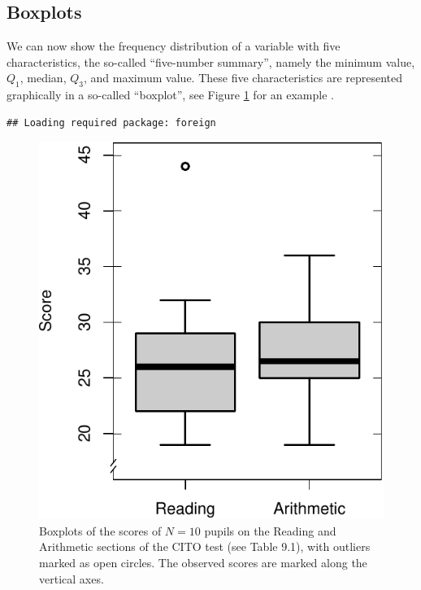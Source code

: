 \documentclass[
]{book}
\begin{document}
\hypertarget{sec:boxplot}{%
\subsection{Boxplots}\label{sec:boxplot}}

We can now show the frequency distribution of a variable with five
characteristics, the so-called ``five-number summary'', namely the minimum value, \(Q_1\),
median, \(Q_3\), and maximum value. These five characteristics are represented graphically
in a so-called ``boxplot'', see
Figure \ref{fig:cito-boxplot}
for an example \citep[ §2C]{Tukey77}.

\begin{verbatim}
## Loading required package: foreign
\end{verbatim}

\begin{figure}
\centering
\includegraphics{QMS-EN_files/figure-latex/cito-boxplot-1.pdf}
\caption{\label{fig:cito-boxplot}Boxplots of the scores of \(N=10\) pupils on the Reading and Arithmetic sections of the CITO test (see Table 9.1), with outliers marked as open circles. The observed scores are marked along the vertical axes.}
\end{figure}
\end{document}
